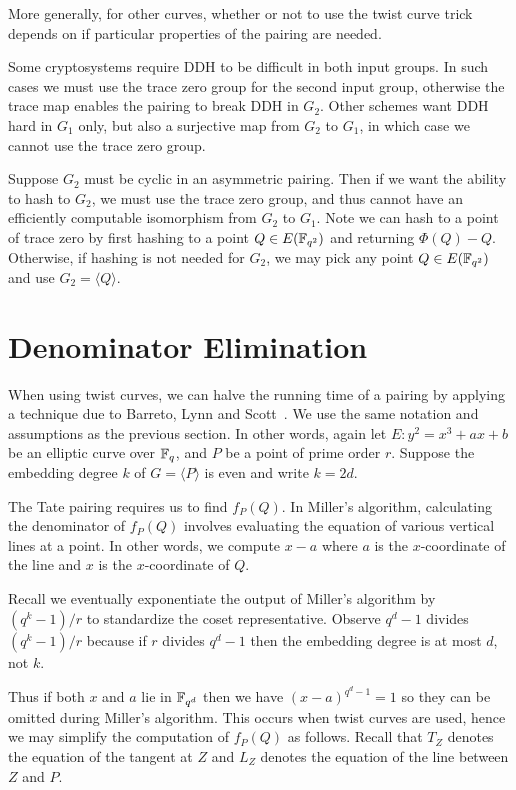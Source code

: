 More generally, for other curves, whether or not to use the twist curve
trick depends on if particular properties of the pairing are needed.

Some cryptosystems require DDH to be difficult in both input groups. In
such cases we must use the trace zero group for the second input group,
otherwise the trace map enables the pairing to break DDH in $G_2$.
Other schemes want DDH hard in $G_1$ only, but also a surjective map
from $G_2$ to $G_1$, in which case we cannot use the trace zero group.

Suppose $G_2$ must be cyclic in an asymmetric pairing.
Then if we want the ability to hash to $G_2$,
we must use the trace zero group, and thus cannot have an efficiently
computable isomorphism from $G_2$ to $G_1$.
Note we can hash to a point of trace zero
by first hashing to a point $Q \in E(\mathbb{F}_{q^2})$ and returning $\Phi(Q) - Q$.
Otherwise, if hashing is not needed for $G_2$, we may pick any point
$Q \in E(\mathbb{F}_{q^2})$ and use $G_2 = \langle Q \rangle$.

\section {\label{sec:denomelim}Denominator Elimination}

When using twist curves, we can halve the running time of a pairing by applying
a technique due to Barreto, Lynn and Scott~\cite{bals2}.
We use the same notation and assumptions as the previous section.
In other words, again let $E : y^2 = x^3 + a x + b$ be an elliptic curve
over $\mathbb{F}_q$,
and $P$ be a point of prime order $r$.
Suppose the embedding degree $k$ of $G = \langle P \rangle$ is even
and write $k = 2d$.

The Tate pairing requires us to find $f_P(Q)$.
In Miller's algorithm, calculating the denominator of
$f_P(Q)$ involves evaluating the equation of various vertical lines
at a point. In other words, we compute $x - a$ where $a$ is the
$x$-coordinate of the line and $x$ is the $x$-coordinate of $Q$.

Recall we eventually exponentiate the output of Miller's algorithm by
$(q^k - 1)/r$ to standardize the coset representative. Observe
$q^d - 1$ divides $(q^k-1)/r$ because if $r$ divides $q^d - 1$ then
the embedding degree is at most $d$, not $k$.

Thus if both $x$ and $a$ lie in $\mathbb{F}_{q^d}$ then we have
$(x-a)^{q^d - 1} = 1$ so they can be omitted during Miller's algorithm.
This occurs when twist curves are used, hence we may simplify
the computation of $f_P(Q)$ as follows. Recall that $T_Z$ denotes the
equation of the tangent at $Z$ and $L_Z$ denotes the equation of
the line between $Z$ and $P$.

